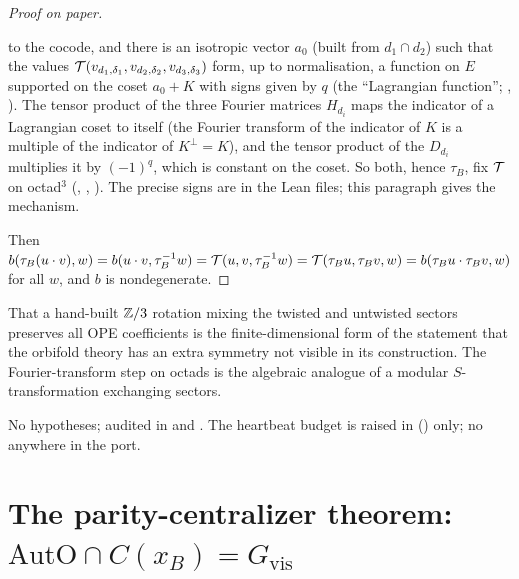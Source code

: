 \begin{proof}[Proof on paper]
\begin{enumerate}[label=(\roman*)]
  to the cocode, and there is an isotropic vector $a_0$ (built from $d_1\cap d_2$) such that the values
  $\mathcal{T}(v_{d_1,\delta_1},v_{d_2,\delta_2},v_{d_3,\delta_3})$ form, up to normalisation, a function on $E$
  supported on the coset $a_0+K$ with signs given by $q$ (the ``Lagrangian function'';
  , ).  The tensor product of
  the three Fourier matrices $H_{d_i}$ maps the indicator of a Lagrangian coset to itself (the Fourier
  transform of the indicator of $K$ is a multiple of the indicator of $K^\perp=K$), and the tensor product
  of the $D_{d_i}$ multiplies it by $(-1)^q$, which is constant on the coset.  So both, hence $\tau_B$,
  fix $\mathcal{T}$ on octad${}^3$ (, ,
  ).  The precise signs are in the Lean files; this paragraph gives
  the mechanism.
\end{enumerate}
Then $b(\tau_B(u\cdot v),w)=b(u\cdot v,\tau_B^{-1}w)=\mathcal{T}(u,v,\tau_B^{-1}w)=\mathcal{T}(\tau_Bu,\tau_Bv,w)=b(\tau_Bu\cdot\tau_Bv,w)$
for all $w$, and $b$ is nondegenerate.
\end{proof}
\begin{physics}
That a hand-built ${\mathbb{Z}}/3$ rotation mixing the twisted and untwisted sectors preserves all OPE
coefficients is the finite-dimensional form of the statement that the orbifold theory has an extra
symmetry not visible in its construction.  The Fourier-transform step on octads is the algebraic
analogue of a modular $S$-transformation exchanging sectors.
\end{physics}
\begin{status}
No hypotheses; audited in  and
.  The heartbeat budget is raised in
 () only; no  anywhere in
the port.
\end{status}

\section{The parity-centralizer theorem: \texorpdfstring{$\mathrm{AutO}\cap C(x_B)=G_{\mathrm{vis}}$}{AutO meet C(xB) = Gvis}}\label{ch21:sec:parity}

